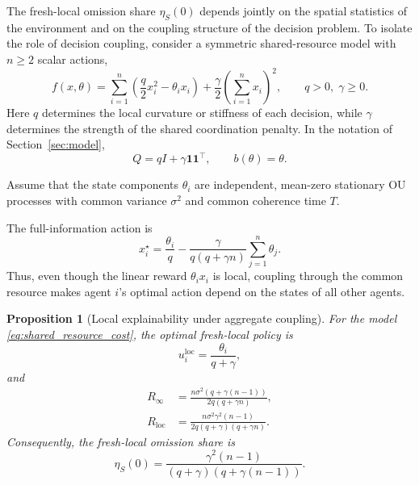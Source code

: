 \documentclass[11pt]{article}
\newtheorem{proposition}{Proposition}
\begin{document}
The fresh-local omission share $\eta_S(0)$ depends jointly on the
spatial statistics of the environment and on the coupling structure of the
decision problem. To isolate the role of decision coupling, consider a
symmetric shared-resource model with $n\ge2$ scalar actions,
\begin{equation}
    f(x,\theta)
    =
    \sum_{i=1}^{n}
    \left(
        \frac{q}{2}x_i^2-\theta_i x_i
    \right)
    +
    \frac{\gamma}{2}
    \left(
        \sum_{i=1}^{n}x_i
    \right)^2,
    \qquad
    q>0,\;\gamma\ge0.
    \label{eq:shared_resource_cost}
\end{equation}
Here $q$ determines the local curvature or stiffness of each decision, while
$\gamma$ determines the strength of the shared coordination penalty. In the
notation of Section~\ref{sec:model},
\begin{equation}
    Q
    =
    qI+\gamma\mathbf{1}\mathbf{1}^\top,
    \qquad
    b(\theta)=\theta.
    \label{eq:shared_resource_Q}
\end{equation}

Assume that the state components $\theta_i$ are independent, mean-zero
stationary OU processes with common variance $\sigma^2$ and common coherence
time $T$.

The full-information action is
\begin{equation}
    x_i^\star
    =
    \frac{\theta_i}{q}
    -
    \frac{\gamma}
    {q(q+\gamma n)}
    \sum_{j=1}^{n}\theta_j.
    \label{eq:shared_resource_xstar}
\end{equation}
Thus, even though the linear reward $\theta_i x_i$ is local, coupling through
the common resource makes agent $i$'s optimal action depend on the states of
all other agents.

\begin{proposition}[Local explainability under aggregate coupling]
\label{prop:aggregate_local}
For the model \eqref{eq:shared_resource_cost}, the optimal fresh-local policy
is
\begin{equation}
    u_i^{\mathrm{loc}}
    =
    \frac{\theta_i}{q+\gamma},
    \label{eq:optimal_local_shared}
\end{equation}
and
\begin{align}
    R_\infty
    &=
    \frac{
        n\sigma^2
        \left(
            q+\gamma(n-1)
        \right)
    }{
        2q(q+\gamma n)
    },
    \label{eq:aggregate_Rinf}
    \\
    R_{\mathrm{loc}}
    &=
    \frac{
        n\sigma^2\gamma^2(n-1)
    }{
        2q(q+\gamma)(q+\gamma n)
    }.
    \label{eq:aggregate_Rloc}
\end{align}
Consequently, the fresh-local omission share is
\begin{equation}
    \boxed{
    \eta_S(0)
    =
    \frac{
        \gamma^2(n-1)
    }{
        (q+\gamma)
        \left(
            q+\gamma(n-1)
        \right)
    }.
    }
    \label{eq:aggregate_eta}
\end{equation}
\end{proposition}
\end{document}
